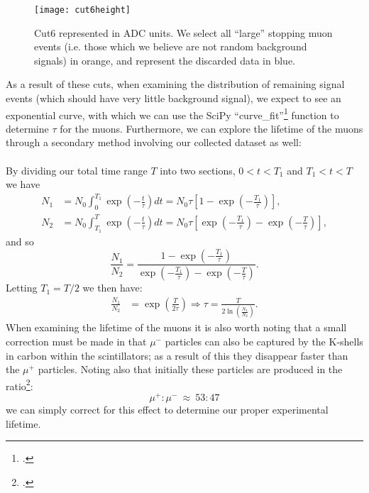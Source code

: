 \documentclass[a4paper]{article}
\begin{document}
\begin{figure}[h!]
\begin{center}
	\texttt{[image: cut6height]}
\end{center}
\caption{Cut6 represented in ADC units. We select all ``large'' stopping muon events (i.e. those which we believe are not random background signals) in orange, and represent the discarded data in blue.}
\end{figure}
\newpage \noindent
As a result of these cuts, when examining the distribution of remaining signal events (which should have very little background signal), we expect to see an exponential curve, with which we can use the SciPy ``curve\_fit''\footcite{curvefit} function to determine $\tau$ for the muons. Furthermore, we can explore the lifetime of the muons through a secondary method involving our collected dataset as well:
\\\\
By dividing our total time range $T$ into two sections, $0<t<T_1$ and $T_1<t<T$ we have
\begin{align}
	N_1 &=  N_0 \int^{T_1}_{0} \exp\left( - \frac{t}{\tau}  \right)dt = N_0 \tau \left[ 1-\exp \left( - \frac{T_1}{\tau}  \right) \right],\\
	N_2 &=  N_0 \int^{T}_{T_1} \exp\left( - \frac{t}{\tau}  \right)dt = N_0 \tau \left[ \exp\left( - \frac{T_1}{\tau}  \right) -\exp \left( - \frac{T}{\tau}  \right) \right],
\end{align}
and so
\begin{equation}
	\frac{N_1}{N_2} = \frac{1 - \exp\left( - \frac{T_1}{\tau}  \right) }{ \exp \left( - \frac{T_1}{\tau}  \right) - \exp \left( - \frac{T}{\tau}  \right)}.  
\end{equation}
Letting $T_1 = T/2$ we then have:
\begin{align}
	\frac{N_1}{N_2} &= \exp \left( \frac{T}{2\tau}  \right) \Rightarrow \tau = \frac{T}{2 \ln \left( \frac{N_1}{N_2}  \right)}.
\end{align}
When examining the lifetime of the muons it is also worth noting that a small correction must be made in that $\mu^-$ particles can also be captured by the K-shells in carbon within the scintillators; as a result of this they disappear faster than the $\mu^+$ particles. Noting also that initially these particles are produced in the ratio\footcite{chargeratio}:
\begin{equation*}
	\mu^+ : \mu^- \: \approx \: 53:47 
\end{equation*}
we can simply correct for this effect to determine our proper experimental lifetime.
\end{document}
